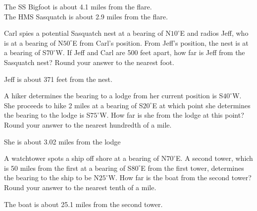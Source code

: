 \documentclass{ximera}
\begin{document}
\begin{question}
\begin{problem}
\begin{solution}
The SS Bigfoot is about 4.1 miles from the flare. \\
The HMS Sasquatch is about 2.9 miles from the flare.
\end{solution}
\end{problem}

\begin{problem}
Carl spies a potential Sasquatch nest at a bearing of N$10^{\circ}$E and radios Jeff, who is at a bearing of N$50^{\circ}$E from Carl's position.  From Jeff's position, the nest is at a bearing of S$70^{\circ}$W. If Jeff and Carl are 500 feet apart, how far is Jeff from the Sasquatch nest?  Round your answer to the nearest foot.

\begin{solution}
Jeff is about 371 feet from the nest.
\end{solution}
\end{problem}

\begin{problem}
A hiker determines the bearing to a lodge from her current position is S$40^{\circ}$W.  She proceeds to hike 2 miles at a bearing of S$20^{\circ}$E at which point she determines the bearing to the lodge is S$75^{\circ}$W.  How far is she from the lodge at this point?  Round your answer to the nearest hundredth of a mile.

\begin{solution}
She is about 3.02 miles from the lodge
\end{solution}
\end{problem}

\begin{problem} \label{bearinglastexercise} 
A watchtower spots a ship off shore at a bearing of N$70^{\circ}$E.  A second tower, which is 50 miles from the first at a bearing of S$80^{\circ}$E from the first tower, determines the bearing to the ship to be N$25^{\circ}$W. How far is the boat from the second tower?  Round your answer to the nearest tenth of a mile.

\begin{solution}
The boat is about 25.1 miles from the second tower.
\end{solution}
\end{problem}
\end{question}
\end{document}
